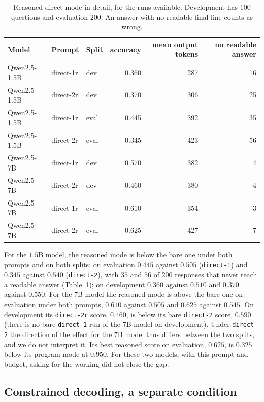 \documentclass[11pt,a4paper]{article}
\newcommand{\code}[1]{\texttt{\small #1}}
\begin{document}
\begin{table}[ht]
\centering
\small
\begin{tabular}{lllrrr}
\toprule
Model & Prompt & Split & accuracy & mean output tokens & no readable answer \\
\midrule
Qwen2.5-1.5B & direct-1r & dev  & 0.360 & 287 & 16 \\
Qwen2.5-1.5B & direct-2r & dev  & 0.370 & 306 & 25 \\
Qwen2.5-1.5B & direct-1r & eval & 0.445 & 392 & 35 \\
Qwen2.5-1.5B & direct-2r & eval & 0.345 & 423 & 56 \\
Qwen2.5-7B   & direct-1r & dev  & 0.570 & 382 & 4 \\
Qwen2.5-7B   & direct-2r & dev  & 0.460 & 380 & 4 \\
Qwen2.5-7B   & direct-1r & eval & 0.610 & 354 & 3 \\
Qwen2.5-7B   & direct-2r & eval & 0.625 & 427 & 7 \\
\bottomrule
\end{tabular}
\caption{Reasoned direct mode in detail, for the runs available. Development
has $100$ questions and evaluation $200$. An answer with no readable final
line counts as wrong.}
\label{tab:reasoned}
\end{table}

For the $1.5$B model, the reasoned mode is below the bare one under both
prompts and on both splits: on evaluation $0.445$ against $0.505$
(\code{direct-1}) and $0.345$ against $0.540$ (\code{direct-2}), with $35$
and $56$ of $200$ responses that never reach a readable answer
(Table~\ref{tab:reasoned}); on development $0.360$ against $0.510$ and
$0.370$ against $0.550$. For the $7$B model the reasoned mode is above the
bare one on evaluation under both prompts, $0.610$ against $0.505$ and
$0.625$ against $0.545$. On development its \code{direct-2r} score, $0.460$,
is below its bare \code{direct-2} score, $0.590$ (there is no bare
\code{direct-1} run of the $7$B model on development). Under
\code{direct-2} the direction of the effect for the $7$B model thus differs
between the two splits, and we do not interpret it. Its best reasoned score
on evaluation, $0.625$, is $0.325$ below its program mode at $0.950$. For
these two models, with this prompt and budget, asking for the working did
not close the gap.

\subsection{Constrained decoding, a separate condition}
\label{sec:constrained}
\end{document}
